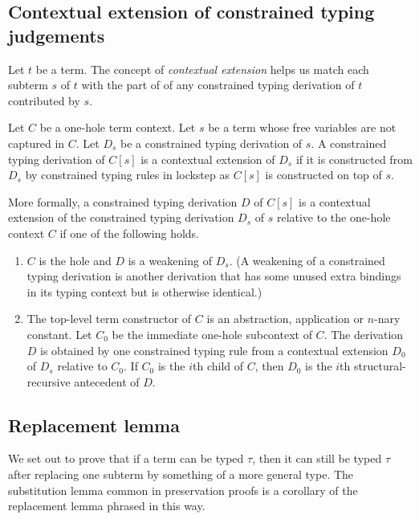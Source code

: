 \subsection{Contextual extension of constrained typing
judgements}

Let $t$ be a term. The concept of \emph{contextual extension}
helps us match each subterm $s$ of $t$ with the part of of any
constrained typing derivation of $t$ contributed by $s$.

Let $C$ be a one-hole term context. Let $s$ be a term whose free
variables are not captured in $C$. Let $D_s$ be a constrained
typing derivation of $s$. A constrained typing derivation of
$C[s]$ is a contextual extension of $D_s$ if it is constructed
from $D_s$ by constrained typing rules in lockstep as $C[s]$ is
constructed on top of $s$.

More formally, a constrained typing derivation $D$ of $C[s]$ is a
contextual extension of the constrained typing derivation $D_s$
of $s$ relative to the one-hole context $C$ if one of the
following holds.
\begin{enumerate}
\item $C$ is the hole and $D$ is a weakening of $D_s$. (A
weakening of a constrained typing derivation is another
derivation that has some unused extra bindings in its typing
context but is otherwise identical.)
\item The top-level term constructor of $C$ is an abstraction,
application or $n$-nary constant. Let $C_0$ be the immediate
one-hole subcontext of $C$. The derivation $D$ is obtained by one
constrained typing rule from a contextual extension $D_0$ of
$D_s$ relative to $C_0$. If $C_0$ is the $i$th child of $C$, then
$D_0$ is the $i$th structural-recursive antecedent of $D$.
\end{enumerate}


\subsection{Replacement lemma}
\label{sublem}

We set out to prove that if a term can be typed $\tau$, then it
can still be typed $\tau$ after replacing one subterm by
something of a more general type. The substitution lemma common
in preservation proofs is a corollary of the replacement lemma
phrased in this way.

\def\Exi{\emptyset}

